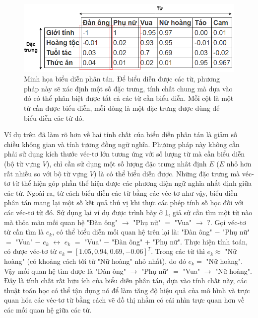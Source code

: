 \begin{figure}
	\centering
	\includegraphics[width=1.0\textwidth]{distributed-representation_1}
	\caption[Minh họa biểu diễn phân tán]{Minh họa biểu diễn phân tán. Để biểu diễn được các từ, phương pháp này sẽ xác định một số đặc trưng, tính chất chung mà dựa vào đó có thể phân biệt được tất cả các từ cần biểu diễn. Mỗi cột là một từ cần được biểu diễn, mỗi dòng là một đặc trưng được dùng để biểu diễn các từ đó.}
	\label{fig_distributed_representation}
\end{figure}

Ví dụ trên đã làm rõ hơn về hai tính chất của biểu diễn phân tán là giảm số chiều không gian và tính tương đồng ngữ nghĩa. Phương pháp này không cần phải sử dụng kích thước véc-tơ lớn tương ứng với số lượng từ mà cần biểu diễn (bộ từ vựng $V$), chỉ cần sử dụng một số lượng đặc trưng nhât định $E$ ($E$ nhỏ hơn rất nhiều so với bộ từ vựng $V$) là có thể biểu diễn được. Những đặc trưng mà véc-tơ từ thể hiện góp phần thể hiện được các phương diện ngữ nghĩa nhất định giữa các từ. Ngoài ra, từ cách biểu diễn các từ bằng các véc-tơ như vậy, biểu diễn phân tán mang lại một số kết quả thú vị khi thực các phép tính số học đối với các véc-tơ từ đó. Sử dụng lại ví dụ được trình bày ở \ref{fig_distributed_representation}, giả sử cần tìm một từ nào mà thỏa mãn mối quan hệ "Đàn ông" $\rightarrow$ "Phụ nữ" $=$ "Vua" $\rightarrow$ $?$. 	Gọi véc-tơ từ cần tìm là $e_k$, có thể biểu diễn mối quan hệ trên lại là: "Đàn ông" $-$ "Phụ nữ" $=$ "Vua" $-$ $e_k$ $\leftrightarrow$ $e_k$ $=$ "Vua" $-$ "Đàn ông" $+$ "Phụ nữ". Thực hiện tính toán, có được véc-tơ từ $e_k = \left[ 1.05, 0.94, 0.69, -0.06\right]^T$. Trong các từ thì $e_k \approx$ "Nữ hoàng" (có khoảng cách tới từ "Nữ hoàng" nhỏ nhất), do đó $e_k =$ "Nữ hoàng". Vậy mối quan hệ tìm được là "Đàn ông" $\rightarrow$ "Phụ nữ" $=$ "Vua" $\rightarrow$ "Nữ hoàng". Đây là tính chất rất hữu ích của biểu diễn phân tán, dựa vào tính chất này, các thuật toán học có thể tận dụng nó để làm tăng độ hiệu quả của mô hình và trực quan hóa các véc-tơ từ bằng cách vẽ đồ thị nhằm có cái nhìn trực quan hơn về các mối quan hệ giữa các từ.

